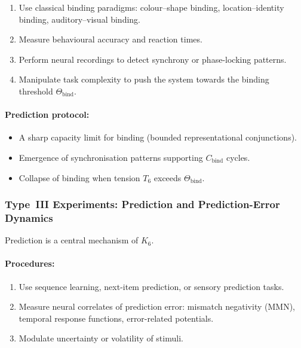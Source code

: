 \begin{enumerate}
    \item Use classical binding paradigms:
          colour–shape binding, location–identity binding,
          auditory–visual binding.
    \item Measure behavioural accuracy and reaction times.
    \item Perform neural recordings to detect synchrony or
          phase-locking patterns.
    \item Manipulate task complexity to push the system towards
          the binding threshold $\Theta_{\mathrm{bind}}$.
\end{enumerate}

\paragraph{Prediction protocol:}

\begin{itemize}
    \item A sharp capacity limit for binding 
          (bounded representational conjunctions).
    \item Emergence of synchronisation patterns supporting 
          $C_{\mathrm{bind}}$ cycles.
    \item Collapse of binding when tension $T_6$ exceeds
          $\Theta_{\mathrm{bind}}$.
\end{itemize}



\subsubsection{Type~III Experiments: Prediction and Prediction-Error Dynamics}

Prediction is a central mechanism of $K_6$.

\paragraph{Procedures:}

\begin{enumerate}
    \item Use sequence learning, next-item prediction,
          or sensory prediction tasks.
    \item Measure neural correlates of prediction error:
          mismatch negativity (MMN), temporal response functions,
          error-related potentials.
    \item Modulate uncertainty or volatility of stimuli.
\end{enumerate}

